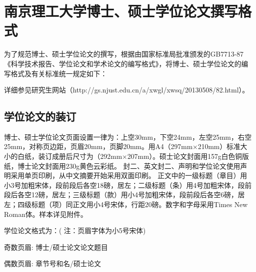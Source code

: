 \chapter{南京理工大学博士、硕士学位论文撰写格式}
\label{app:format}
为了规范博士、硕士学位论文的撰写，根据由国家标准局批准颁发的GB7713-87《科学技术报告、学位论文和学术论文的编写格式》，将博士、硕士学位论文的编写格式及有关标准统一规定如下：

详细参见研究生网站（http://gs.njust.edu.cn/a/xwgl/xwsq/20130508/82.html）。

\section{学位论文的装订}

博士、硕士学位论文页面设置一律为：上空30mm，下空24mm，左空25mm，右空25mm，对称页边距，页眉20mm，页脚20mm。用A4（297mm$\times $210mm）标准大小的白纸，装订成册后尺寸为（292mm$\times$207mm）。硕士论文封面用157g白色铜版纸，博士论文封面用230g黄色云彩纸。
封二、英文封二、声明和学位论文使用声明采用单页印刷，从中文摘要开始采用双面印刷。
正文中的一级标题（章目）用小3号加粗宋体，段前段后各空18磅，居左；二级标题（条）用4号加粗宋体，段前段后各空12磅，居左；三级标题（款）用小4号加粗宋体，段前段后各空6磅，居左；四级标题（项）同正文用小4号宋体，行距20磅。数字和字母采用Times New Roman体。样本详见附件。

学位论文格式为：( 注：页眉字体为小5号宋体)

奇数页眉:
博士/硕士论文\hspace{40pt}论文题目

偶数页眉:
章节号和名\hspace{40pt}/硕士论文

